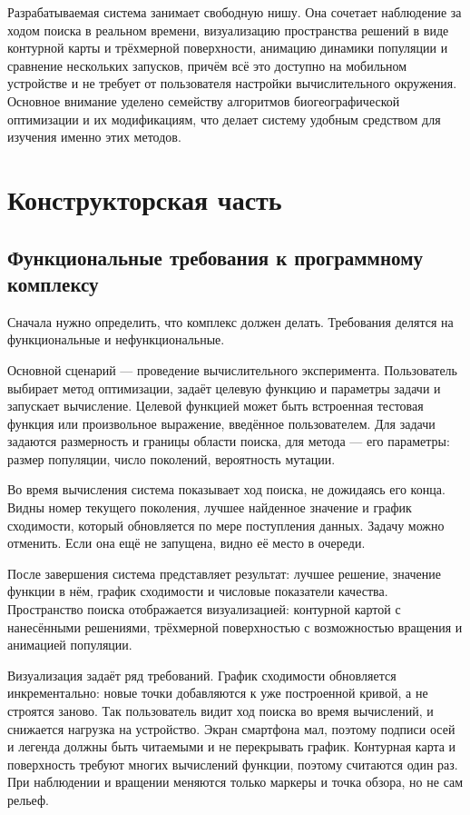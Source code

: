 \documentclass[14pt, a4paper]{extarticle}
\begin{document}
Разрабатываемая система занимает свободную нишу. Она сочетает наблюдение за ходом
поиска в реальном времени, визуализацию пространства решений в виде контурной
карты и трёхмерной поверхности, анимацию динамики популяции и сравнение нескольких
запусков, причём всё это доступно на мобильном устройстве и не требует от
пользователя настройки вычислительного окружения. Основное внимание уделено
семейству алгоритмов биогеографической оптимизации и их модификациям, что делает
систему удобным средством для изучения именно этих методов.

\section{Конструкторская часть}\label{sec:design}

\subsection{Функциональные требования к программному комплексу}
\label{subsec:requirements}

Сначала нужно определить, что комплекс должен делать. Требования делятся на
функциональные и нефункциональные.

Основной сценарий --- проведение вычислительного эксперимента. Пользователь
выбирает метод оптимизации, задаёт целевую функцию и параметры задачи и запускает
вычисление. Целевой функцией может быть встроенная тестовая функция или
произвольное выражение, введённое пользователем. Для задачи задаются размерность и
границы области поиска, для метода --- его параметры: размер популяции, число
поколений, вероятность мутации.

Во время вычисления система показывает ход поиска, не дожидаясь его конца. Видны
номер текущего поколения, лучшее найденное значение и график сходимости, который
обновляется по мере поступления данных. Задачу можно отменить. Если она ещё не
запущена, видно её место в очереди.

После завершения система представляет результат: лучшее решение, значение функции
в нём, график сходимости и числовые показатели качества. Пространство поиска
отображается визуализацией: контурной картой с нанесёнными решениями, трёхмерной
поверхностью с возможностью вращения и анимацией популяции.

Визуализация задаёт ряд требований. График сходимости обновляется инкрементально:
новые точки добавляются к уже построенной кривой, а не строятся заново. Так
пользователь видит ход поиска во время вычислений, и снижается нагрузка на
устройство. Экран смартфона мал, поэтому подписи осей и легенда должны быть
читаемыми и не перекрывать график. Контурная карта и поверхность требуют многих
вычислений функции, поэтому считаются один раз. При наблюдении и вращении меняются
только маркеры и точка обзора, но не сам рельеф.
\end{document}
